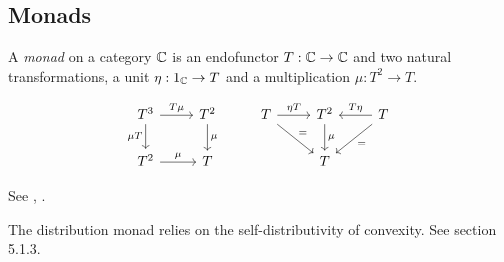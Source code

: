 \documentclass[12pt]{article}
\begin{document}




%

\subsection{Monads}

A \emph{monad} on a category $\mathbb{C}$ is an endofunctor $T:\mathbb{C}\to \mathbb{C}$
and two natural transformations,
a unit $\eta:1_{\mathbb{C}}\to T$ and a multiplication $\mu:T^2\to T.$

\[
\begin{tikzcd}
T^3 \arrow{r}{T\mu} \arrow[swap]{d}{\mu T} & T^2 \arrow{d}{\mu} & 
T \arrow{r}{\eta T}\arrow{dr}{=} & T^2 \arrow{d}{\mu} & \arrow[swap]{l}{T\eta}\arrow{dl}{=} T \\
T^2 \arrow{r}{\mu} & T & 
& T & 
\end{tikzcd}
\]


See \cite{Mac1978}, \cite{Jacobs2012}.

The distribution monad relies on the self-distributivity of convexity.
See \cite{Jacobs2012} section 5.1.3.






{}

\end{document}
